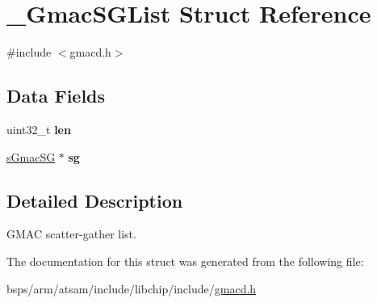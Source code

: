 \hypertarget{struct__GmacSGList}{}\section{\+\_\+\+Gmac\+S\+G\+List Struct Reference}
\label{struct__GmacSGList}


{\ttfamily \#include $<$gmacd.\+h$>$}

\subsection*{Data Fields}
\begin{DoxyCompactItemize}
\item 
\mbox{\label{struct__GmacSGList_a8c81d0e1ca0c35ab35452e52499d0777}} 
uint32\+\_\+t {\bfseries len}
\item 
\mbox{\label{struct__GmacSGList_a3b04c3ccf4f31a1f3b46ce1be88cf05b}} 
\mbox{\hyperlink{group__gmacd__types_gab4ca53499e3bb0601f44e59e17ec7a51}{s\+Gmac\+SG}} $\ast$ {\bfseries sg}
\end{DoxyCompactItemize}


\subsection{Detailed Description}
G\+M\+AC scatter-\/gather list. 

The documentation for this struct was generated from the following file\+:\begin{DoxyCompactItemize}
\item 
bsps/arm/atsam/include/libchip/include/\mbox{\hyperlink{gmacd_8h}{gmacd.\+h}}\end{DoxyCompactItemize}

